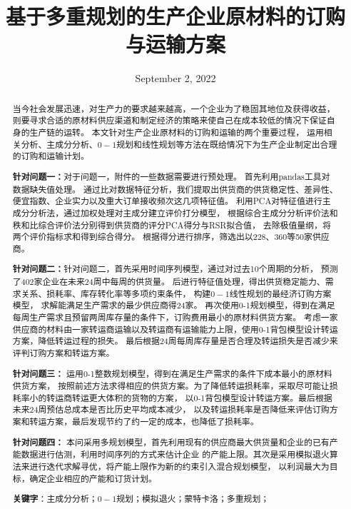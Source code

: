 \documentclass[UTF8]{ctexart}
\title{基于\textbf{多重规划}的生产企业原材料的订购与运输方案}
\date{September 2, 2022}
\begin{document}
\maketitle{}
\renewcommand{\abstractname}{\Large 摘要\\}
\begin{abstract}
	\normalsize
	当今社会发展迅速，对生产力的要求越来越高，一个企业为了稳固其地位及获得收益，
	则要寻求合适的原材料供应渠道和制定经济的策略来使自己在成本较低的情况下保证自身的生产链的运转。
	本文针对生产企业原材料的订购和运输的两个重要过程，
	运用相关分析、主成分分析、$0-1$规划和线性规划等方法在既给情况下为生产企业制定出合理的订购和运输计划。

	\textbf{针对问题一：}对于问题一，附件的一些数据需要进行预处理。
	首先利用pandas工具对数据缺失值处理。
	通过比对数据特征分析，我们提取出供货商的供货稳定性、差异性、便宜指数、企业实力以及重大订单接收频次这几项特征值。
	利用PCA对特征值进行主成分分析法，通过加权处理对主成分建立评价打分模型，
	根据综合主成分分析评价法和秩和比综合评价法分别得到供货商的评分PCA得分与RSR拟合值，
	去除极值量纲，将两个评价指标求和得到综合得分。
	根据得分进行排序，筛选出以228、360等50家供应商。
	
	\textbf{针对问题二：}针对问题二，首先采用时间序列模型，通过对过去10个周期的分析，
	预测了402家企业在未来24周中每周的供货量。
	后进行特征值处理，得出供货稳定能力、需求关系、损耗率、库存转化率等多项约束条件，
	构建$0-1$线性规划的最经济订购方案模型，
	求解能满足生产需求的最少供应商得24家。
	再次使用0-1规划模型，得到在满足每周生产需求且预留两周库存量的条件下，订购费用最小的原材料供货方案。
	考虑一家供应商的材料由一家转运商运输以及转运商有运输能力上限，使用0-1背包模型设计转运方案，降低转运过程的损失。
	最后根据24周每周库存量是否合理及转运损失是否减少来评判订购方案和转运方案。

	\textbf{针对问题三：}
	运用0-1整数规划模型，得到在满足生产需求的条件下成本最小的原材料供货方案，
	按照前述方法求得相应的供货方案。为了降低转运损耗率，采取尽可能让损耗率小的转运商转运更大体积的货物的方案，
	以0-1背包模型设计转运方案。最后根据未来24周预估总成本是否比历史平均成本减少，
	以及转运损耗率是否降低来评估订购方案和转运方案，最后发现节约了约一定的成本，也降低了损耗率。

	\textbf{针对问题四：}
	本问采用多规划模型，首先利用现有的供应商最大供货量和企业的已有产能数据进行估测，利用时间序列的方式来估计企业
	的产能上限。其次是采用模拟退火算法来进行迭代求解寻优，将产能上限作为新的约束引入混合规划模型，
	以利润最大为目标，确定企业相应的产能和订货计划。

	\vspace{3em}

	\textbf{关键字}：主成分分析；$0-1$规划；模拟退火；蒙特卡洛；多重规划；

\end{abstract}
\end{document}

